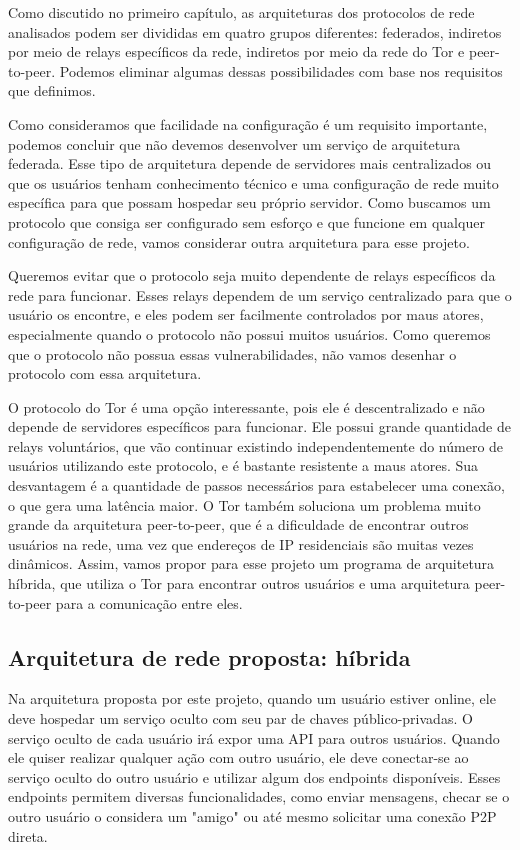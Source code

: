 Como discutido no primeiro capítulo, as arquiteturas dos protocolos de rede analisados podem ser divididas em quatro grupos diferentes: federados, indiretos por meio de relays específicos da rede, indiretos por meio da rede do Tor e peer-to-peer. Podemos eliminar algumas dessas possibilidades com base nos requisitos que definimos.

Como consideramos que facilidade na configuração é um requisito importante, podemos concluir que não devemos desenvolver um serviço de arquitetura federada. Esse tipo de arquitetura depende de servidores mais centralizados ou que os usuários tenham conhecimento técnico e uma configuração de rede muito específica para que possam hospedar seu próprio servidor. Como buscamos um protocolo que consiga ser configurado sem esforço e que funcione em qualquer configuração de rede, vamos considerar outra arquitetura para esse projeto.

Queremos evitar que o protocolo seja muito dependente de relays específicos da rede para funcionar. Esses relays dependem de um serviço centralizado para que o usuário os encontre, e eles podem ser facilmente controlados por maus atores, especialmente quando o protocolo não possui muitos usuários. Como queremos que o protocolo não possua essas vulnerabilidades, não vamos desenhar o protocolo com essa arquitetura.

O protocolo do Tor é uma opção interessante, pois ele é descentralizado e não depende de servidores específicos para funcionar. Ele possui grande quantidade de relays voluntários, que vão continuar existindo independentemente do número de usuários utilizando este protocolo, e é bastante resistente a maus atores. Sua desvantagem é a quantidade de passos necessários para estabelecer uma conexão, o que gera uma latência maior. O Tor também soluciona um problema muito grande da arquitetura peer-to-peer, que é a dificuldade de encontrar outros usuários na rede, uma vez que endereços de IP residenciais são muitas vezes dinâmicos. Assim, vamos propor para esse projeto um programa de arquitetura híbrida, que utiliza o Tor para encontrar outros usuários e uma arquitetura peer-to-peer para a comunicação entre eles.

\subsection{Arquitetura de rede proposta: híbrida}

Na arquitetura proposta por este projeto, quando um usuário estiver online, ele deve hospedar um serviço oculto com seu par de chaves público-privadas. O serviço oculto de cada usuário irá expor uma API para outros usuários. Quando ele quiser realizar qualquer ação com outro usuário, ele deve conectar-se ao serviço oculto do outro usuário e utilizar algum dos endpoints disponíveis. Esses endpoints permitem diversas funcionalidades, como enviar mensagens, checar se o outro usuário o considera um "amigo" ou até mesmo solicitar uma conexão P2P direta.


